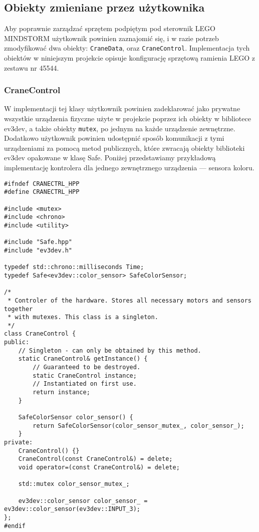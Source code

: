 \documentclass{article}
\begin{document}
\subsection{Obiekty zmieniane przez użytkownika}\label{modifiable}
Aby poprawnie zarządzać sprzętem podpiętym pod sterownik LEGO MINDSTORM
użytkownik powinien zaznajomić się, i w razie potrzeb zmodyfikować dwa obiekty:
\texttt{CraneData}, oraz \texttt{CraneControl}. Implementacja tych obiektów w
niniejszym projekcie opisuje konfigurację sprzętową ramienia LEGO z zestawu nr
45544.
\subsubsection*{CraneControl}
W implementacji tej klasy użytkownik powinien zadeklarować jako prywatne wszystkie urządzenia
fizyczne użyte w projekcie poprzez ich obiekty w bibliotece ev3dev, a także
obiekty \texttt{mutex}, po jednym na każde urządzenie zewnętrzne. Dodatkowo
użytkownik powinien udostępnić sposób komunikacji z tymi urządzeniami za
pomocą metod publicznych, które zwracają obiekty biblioteki ev3dev opakowane w
klasę Safe. Poniżej przedstawiamy przykładową implementację kontrolera dla
jednego zewnętrznego urządzenia --- sensora koloru.
\begin{lstlisting}
#ifndef CRANECTRL_HPP
#define CRANECTRL_HPP

#include <mutex>
#include <chrono>
#include <utility>

#include "Safe.hpp"
#include "ev3dev.h"

typedef std::chrono::milliseconds Time;
typedef Safe<ev3dev::color_sensor> SafeColorSensor;

/*
 * Controler of the hardware. Stores all necessary motors and sensors together
 * with mutexes. This class is a singleton.
 */
class CraneControl {
public:
    // Singleton - can only be obtained by this method.
    static CraneControl& getInstance() {
        // Guaranteed to be destroyed.
        static CraneControl instance;
        // Instantiated on first use.
        return instance;
    }

    SafeColorSensor color_sensor() {
        return SafeColorSensor(color_sensor_mutex_, color_sensor_);
    }
private:
    CraneControl() {}
    CraneControl(const CraneControl&) = delete;
    void operator=(const CraneControl&) = delete;

    std::mutex color_sensor_mutex_;

    ev3dev::color_sensor color_sensor_ = ev3dev::color_sensor(ev3dev::INPUT_3);
};
#endif
\end{lstlisting}
\end{document}
